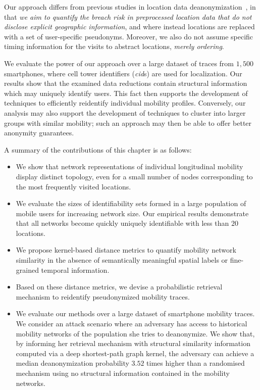 Our approach differs from previous studies in location data deanonymization~\citep{Gambs2014, deMulder08, Naini2016a, Golle2009}, in that \emph{we aim to quantify the breach risk in preprocessed location data that do not disclose explicit geographic information}, and where instead locations are replaced with a set of user-specific pseudonyms.
Moreover, we also do not assume specific timing information for the visits to abstract locations, \emph{merely ordering}.

We evaluate the power of our approach over a large dataset of traces from $1,500$ smartphones, where cell tower identifiers (\emph{cid}s) are used for localization.
Our results show that the examined data reductions contain structural information which may uniquely identify users.
This fact then supports the development of techniques to efficiently reidentify individual mobility profiles.
Conversely, our analysis may also support the development of techniques to cluster into larger groups with similar mobility; such an approach may then be able to offer better anonymity guarantees.

A summary of the contributions of this chapter is as follows:

\begin{itemize}

\item We show that network representations of individual longitudinal mobility display distinct topology, even for a small number of nodes corresponding to the most frequently visited locations.

\item We evaluate the sizes of identifiability sets formed in a large population of mobile users for increasing network size.
Our empirical results demonstrate that all networks become quickly uniquely identifiable with less than $20$ locations.

\item We propose kernel-based distance metrics to quantify mobility network similarity in the absence of semantically meaningful spatial labels or fine-grained temporal information.

\item Based on these distance metrics, we devise a probabilistic retrieval mechanism to reidentify pseudonymized mobility traces.

\item We evaluate our methods over a large dataset of smartphone mobility traces. We consider an attack scenario where an adversary has access to historical mobility networks of the population she tries to deanonymize. We show that, by informing her retrieval mechanism with structural similarity information computed via a deep shortest-path graph kernel, the adversary can achieve a median deanonymization probability $3.52$ times higher than a randomised mechanism using no structural information contained in the mobility networks.

\end{itemize}

